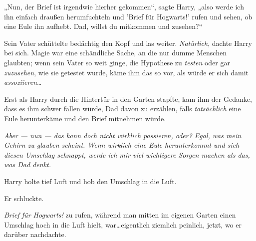 „Nun, der Brief ist irgendwie hierher gekommen“, sagte Harry, „also werde ich ihn einfach draußen herumfuchteln und 'Brief für Hogwarts!' rufen und sehen, ob eine Eule ihn aufhebt. Dad, willst du mitkommen und zusehen?“

Sein Vater schüttelte bedächtig den Kopf und las weiter. \emph{Natürlich}, dachte Harry bei sich. Magie war eine schändliche Sache, an die nur dumme Menschen glaubten; wenn sein Vater so weit ginge, die Hypothese zu \emph{testen} oder gar \emph{zuzusehen}, wie sie getestet wurde, käme ihm das so vor, als würde er sich damit \emph{assoziieren}…

Erst als Harry durch die Hintertür in den Garten stapfte, kam ihm der Gedanke, dass es ihm schwer fallen würde, Dad davon zu erzählen, falls \emph{tatsächlich} eine Eule herunterkäme und den Brief mitnehmen würde.

\emph{Aber — nun — das kann doch nicht \emph{wirklich} passieren, oder? Egal, was mein Gehirn zu glauben scheint. Wenn wirklich eine Eule herunterkommt und sich diesen Umschlag schnappt, werde ich mir viel wichtigere Sorgen machen als das, was Dad denkt.}

Harry holte tief Luft und hob den Umschlag in die Luft.

Er schluckte.

\emph{Brief für Hogwarts!} zu rufen, während man mitten im eigenen Garten einen Umschlag hoch in die Luft hielt, war…eigentlich ziemlich peinlich, jetzt, wo er darüber nachdachte.

